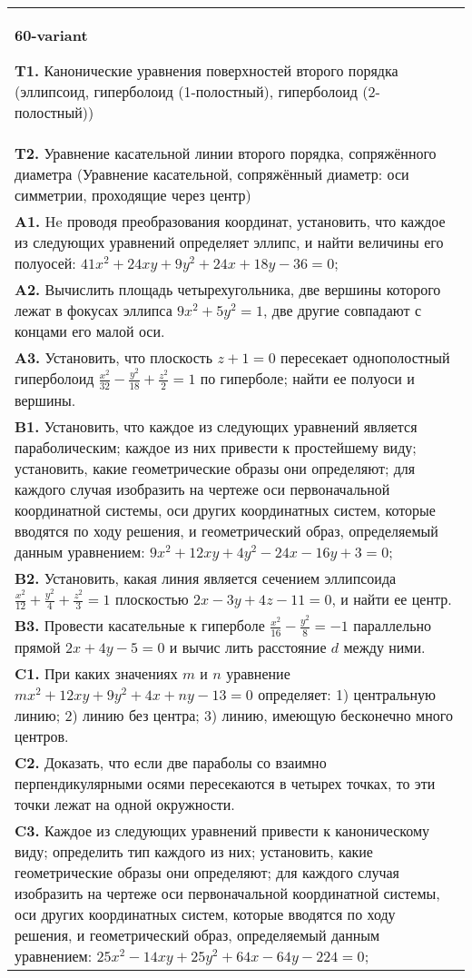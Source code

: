 \documentclass{article}
\begin{document}
\begin{tabular}{m{17cm}}
\textbf{60-variant}
\newline

\textbf{T1.} Канонические уравнения поверхностей второго порядка (эллипсоид, гиперболоид (1-полостный), гиперболоид (2-полостный)) \\
\textbf{T2.} Уравнение касательной линии второго порядка, сопряжённого диаметра (Уравнение касательной, сопряжённый диаметр: оси симметрии, проходящие через центр) \\
\textbf{A1.} He проводя преобразования координат, установить, что каждое из следующих уравнений определяет эллипс, и найти величины его полуосей: $41 x^2+24 x y+9 y^2+24 x+18 y-36=0$; \\
\textbf{A2.} Вычислить площадь четырехугольника, две вершины которого лежат в фокусах эллипса $9 x^2+5 y^2=1$, две другие совпадают с концами его малой оси. \\
\textbf{A3.} Установить, что плоскость $z+1=0$ пересекает однополостный гиперболоид $\frac{x^2}{32}-\frac{y^2}{18}+\frac{z^2}{2}=1$ по гиперболе; найти ее полуоси и вершины. \\
\textbf{B1.} Установить, что каждое из следующих уравнений является параболическим; каждое из них привести к простейшему виду; установить, какие геометрические образы они определяют; для каждого случая изобразить на чертеже оси первоначальной координатной системы, оси других координатных систем, которые вводятся по ходу решения, и геометрический образ, определяемый данным уравнением: $9 x^2+12 x y+4 y^2-24 x-16 y+3=0$; \\
\textbf{B2.} Установить, какая линия является сечением эллипсоида $\frac{x^2}{12}+\frac{y^2}{4}+\frac{z^2}{3}=1$ плоскостью $2 x-3 y+4 z-11=0$, и найти ее центр. \\
\textbf{B3.} Провести касательные к гиперболе $\frac{x^2}{16}-\frac{y^2}{8}=-1$ параллельно прямой $2 x+4 y-5=0$ и вычис лить расстояние $d$ между ними. \\
\textbf{C1.} При каких значениях $m$ и $n$ уравнение $m x^2+12 x y+9 y^2+4 x+n y-13=0$ определяет: 1) центральную линию; 2) линию без центра; 3) линию, имеющую бесконечно много центров. \\
\textbf{C2.} Доказать, что если две параболы со взаимно перпендикулярными осями пересекаются в четырех точках, то эти точки лежат на одной окружности. \\
\textbf{C3.} Каждое из следующих уравнений привести к каноническому виду; определить тип каждого из них; установить, какие геометрические образы они определяют; для каждого случая изобразить на чертеже оси первоначальной координатной системы, оси других координатных систем, которые вводятся по ходу решения, и геометрический образ, определяемый данным уравнением: $25 x^2-14 x y+25 y^2+64 x-64 y-224=0$; \\

\end{tabular}
\vspace{1cm}
\end{document}
